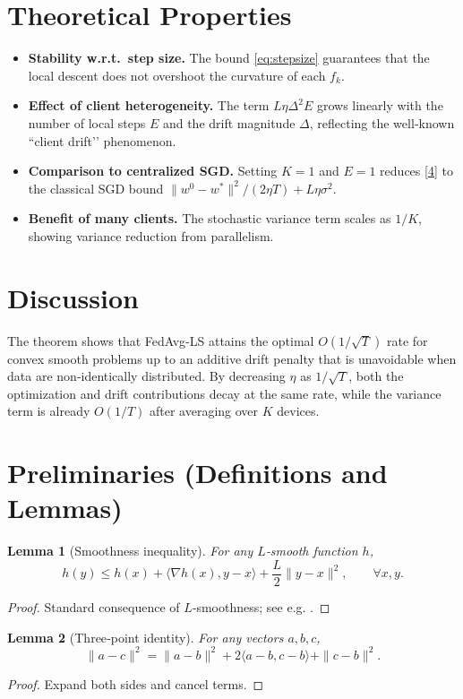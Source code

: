 \documentclass{article}
\newtheorem{lemma}{Lemma}
\begin{document}
\section*{Theoretical Properties}
\begin{itemize}[leftmargin=*]
  \item \textbf{Stability w.r.t.\ step size.} The bound \eqref{eq:stepsize} guarantees that the local descent does not overshoot the curvature of each $f_k$.
  \item \textbf{Effect of client heterogeneity.} The term $L\eta\Delta^{2}E$ grows linearly with the number of local steps $E$ and the drift magnitude $\Delta$, reflecting the well‑known “client drift’’ phenomenon.
  \item \textbf{Comparison to centralized SGD.} Setting $K=1$ and $E=1$ reduces \eqref{4} to the classical SGD bound $\|w^{0}-w^{*}\|^{2}/(2\eta T)+L\eta\sigma^{2}$.
  \item \textbf{Benefit of many clients.} The stochastic variance term scales as $1/K$, showing variance reduction from parallelism.
\end{itemize}

\section*{Discussion}
The theorem shows that FedAvg‑LS attains the optimal $O(1/\sqrt{T})$ rate for convex smooth problems up to an additive drift penalty that is unavoidable when data are non‑identically distributed. By decreasing $\eta$ as $1/\sqrt{T}$, both the optimization and drift contributions decay at the same rate, while the variance term is already $O(1/T)$ after averaging over $K$ devices.

\newpage
\section*{Preliminaries (Definitions and Lemmas)}
\begin{lemma}[Smoothness inequality]\label{lem:smooth}
For any $L$‑smooth function $h$,
\[
h(y)\le h(x)+\langle\nabla h(x),y-x\rangle+\frac{L}{2}\|y-x\|^{2},\qquad\forall x,y.
\]
\end{lemma}
\begin{proof}
Standard consequence of $L$‑smoothness; see e.g. \cite{Nesterov2004}. \qedhere
\end{proof}

\begin{lemma}[Three‑point identity]\label{lem:three}
For any vectors $a,b,c$,
\[
\|a-c\|^{2}= \|a-b\|^{2}+2\langle a-b,c-b\rangle+\|c-b\|^{2}.
\]
\end{lemma}
\begin{proof}
Expand both sides and cancel terms. \qedhere
\end{proof}
\end{document}
